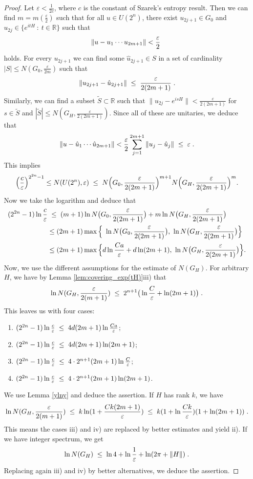 \documentclass[12pt, a4-paper]{amsart}
\newcommand{\R}{\mathbb{R}}
\numberwithin{equation}{section}
\newcommand{\kl}{\pl \le \pl}
\newcommand{\rz}{{\mathbb R}}
\newcommand{\pl}{\hspace{.1cm}}
\newcommand{\eps}{\varepsilon}
\begin{document}
\begin{proof} Let $\eps<\frac{1}{2c}$, where $c$ is the constant of Szarek's entropy result. Then we can find $m=m(\frac{\eps}{2})$ such that for all $u \in U(2^n)$, there exist $u_{2j+1} \in G_0$ and $u_{2j} \in \{ e^{it H} ~:~ t \in \R \}$ such that
\[ 
    \|u-u_1\cdots u_{2m+1}\|<\frac{\eps}{2} \pl
\] 
holds.
For every $u_{2j+1}$ we can find some $\hat{u}_{2j+1}\in S$ in a set of cardinality $|S|\le N(G_0,\frac{\eps}{2m})$ such that 
 \[ \|u_{2j+1}-\hat{u}_{2j+1}\|\kl \frac{\eps}{2(2m+1)} \pl .\] 
Similarly, we can find a subset $\tilde{S}\subset \rz$ such that $\|u_{2j}-e^{isH}\|<\frac{\eps}{2(2m+1)}$ for $s\in \tilde{S}$ and $|\tilde{S}|\le N(G_H,\frac{\eps}{2(2m+1)})$.  
Since all of these are unitaries, we deduce that 
 \[ \|u-\hat{u}_1\cdots \hat{u}_{2m+1}\|< \frac{\eps}{2} \sum_{j=1}^{2m+1}\|u_{j}-\hat{u}_j\| \kl \eps \pl .\] 
 This implies
\[ 
    \Big(\frac{c}{\eps} \Big)^{2^{2n}-1} \leq N(U(2^n),\eps)\kl N\Big(G_0,\frac{\eps}{2(2m+1)} \Big)^{m+1}  N \Big(G_H,\frac{\eps}{2(2m+1)} \Big)^{m}.
\]
Now we take the logarithm and deduce that  
 \begin{align*}
     (2^{2n}-1)\ln \frac{c}{\eps} & \kl (m+1)\ln  N\big(G_0,\frac{\eps}{2(2m+1)} \big)+m \ln  N\big(G_H,\frac{\eps}{2(2m+1)} \big) \\
     &\le 
     (2m+1) \max \Big\{\ \ln  N \big(G_0,\frac{\eps}{2(2m+1)} \big),~\ln   N \big(G_H,\frac{\eps}{2(2m+1)} \big) \Big\} \\
     &\le (2m+1) \max \Big\{ d \ln  \frac{Ca}{\eps} + d \ln (2m+1),~ \ln N \big(G_H,\frac{\eps}{2(2m+1)} \big) \Big\}. 
     \end{align*}
Now, we use the different assumptions for the estimate of $N(G_H)$. For arbitrary $H$, we have by Lemma \ref{lem:covering_exp(tH)}iii) that  
\[ 
    \ln N(G_H,\frac{\eps}{2(m+1)}) \kl 2^{n+1} \big(\ln \frac{C}{\eps}+\ln (2m+1) \big)  \pl .
\]
This leaves us with four cases:
  \begin{enumerate}
      \item[i)] $(2^{2n}-1)\ln \frac{c}{\eps} \kl  4 d(2m+1)\ln \frac{Ca}{\eps}$;
      \item[ii)] $(2^{2n}-1)\ln \frac{c}{\eps}\kl 4 d(2m+1)\ln (2m+1)$;
      \item[iii)]  $(2^{2n}-1)\ln \frac{c}{\eps}\kl 4 \cdot  2^{n+1} (2m+1) \ln \frac{C}{\eps}$;
      \item[iv)] $(2^{2n}-1)\ln \frac{c}{\eps}\kl 4  \cdot 2^{n+1} (2m+1)\ln (2m+1)$.
      \end{enumerate}
We use Lemma \ref{ylny} and deduce the assertion.  If $H$ has rank $k$, we have
 \[ \ln N(G_H,\frac{\eps}{2(m+1)}) \kl  k \ln (1+\frac{Ck(2m+1)}{\eps}) 
 \kl k (1+\ln \frac{Ck}{\eps})(1+\ln (2m+1)) \pl. \]
This means the cases iii) and iv) are replaced by better estimates and yield ii). If we have integer spectrum, we get 
 \[ \ln N(G_H)\kl  \ln 4+ \ln \frac{1}{\eps}+\ln (2\pi +\|H\|) \pl .\]
 Replacing again iii) and iv) by better alternatives, we deduce the assertion. \end{proof}
\end{document}
